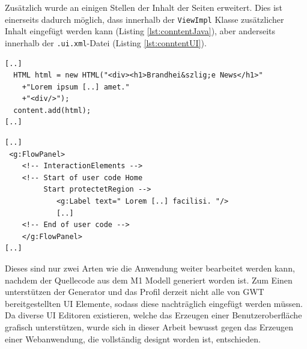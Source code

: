 Zusätzlich wurde an einigen Stellen der Inhalt der Seiten erweitert. Dies ist
einerseits dadurch möglich, dass innerhalb der \texttt{ViewImpl} Klasse
zusätzlicher Inhalt eingefügt werden kann (Listing \ref{lst:conntentJava}), aber
anderseits innerhalb der \texttt{.ui.xml}-Datei (Listing \ref{lst:conntentUI}).

\lstset{language=gwt}
\begin{lstlisting}[caption={Einfügen von Inhalten auf einer Seite durch
Veränderungen am Java-Code},
label={lst:conntentJava}] 
[..] 
  HTML html = new HTML("<div><h1>Brandhei&szlig;e News</h1>"
	+"Lorem ipsum [..] amet."
	+"<div/>");
  content.add(html);
[..]
\end{lstlisting}
\lstset{language=uixml}
\begin{lstlisting}[caption={Einfügen von Inhalten auf einer Seite durch
Veränderungen am \texttt{ui.xml}-Datei},
label={lst:conntentUI}] 
[..] 
 <g:FlowPanel>
	<!-- InteractionElements -->
	<!-- Start of user code Home 
	     Start protectetRegion -->
			<g:Label text=" Lorem [..] facilisi. "/>
			[..]		
	<!-- End of user code -->
	</g:FlowPanel>
[..]
\end{lstlisting}

Dieses sind nur zwei Arten wie die Anwendung weiter bearbeitet werden kann,
nachdem der Quellecode aus dem M1 Modell generiert worden ist. Zum Einen
unterstützen der Generator und das Profil derzeit nicht alle von GWT
bereitgestellten UI Elemente, sodass diese nachträglich eingefügt werden
müssen. Da diverse UI Editoren existieren, welche das Erzeugen einer
Benutzeroberfläche grafisch unterstützen, wurde sich in dieser Arbeit bewusst
gegen das Erzeugen einer Webanwendung, die vollständig designt worden ist,
entschieden. 

